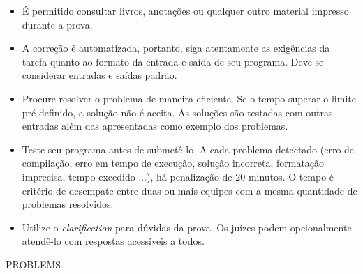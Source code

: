 \documentclass[12pt,oneside]{article} %
\begin{document}
{\scriptsize
\begin{itemize}
 \item É permitido consultar livros, anotações ou qualquer outro material
        impresso durante a prova.

 \item A correção é automatizada, portanto, siga atentamente as exigências
        da tarefa quanto ao formato da entrada e saída de seu programa.
        Deve-se considerar entradas e saídas padrão.

 \item Procure resolver o problema de maneira eficiente. Se o tempo superar
        o limite pré-definido, a solução não é aceita.  As soluções são
        testadas com outras entradas além das apresentadas como exemplo dos
        problemas.

 \item Teste seu programa antes de submetê-lo. A cada problema detectado
        (erro de compilação, erro em tempo de execução, solução incorreta,
        formatação imprecisa, tempo excedido $\dots$), há penalização de
        $20$ minutos. O tempo é critério de desempate entre duas ou mais
        equipes com a mesma quantidade de problemas resolvidos.

 \item Utilize o \emph{clarification} para dúvidas da prova. Os juízes podem
        opcionalmente atendê-lo com respostas acessíveis a todos.
\end{itemize}
}

\clearpage

\pagestyle{fancy}
\renewcommand{\footrulewidth}{0.7pt}
\renewcommand{\headrulewidth}{0.7pt}
\cfoot{\thepage}



\newpage

\newpage

PROBLEMS
\end{document}
